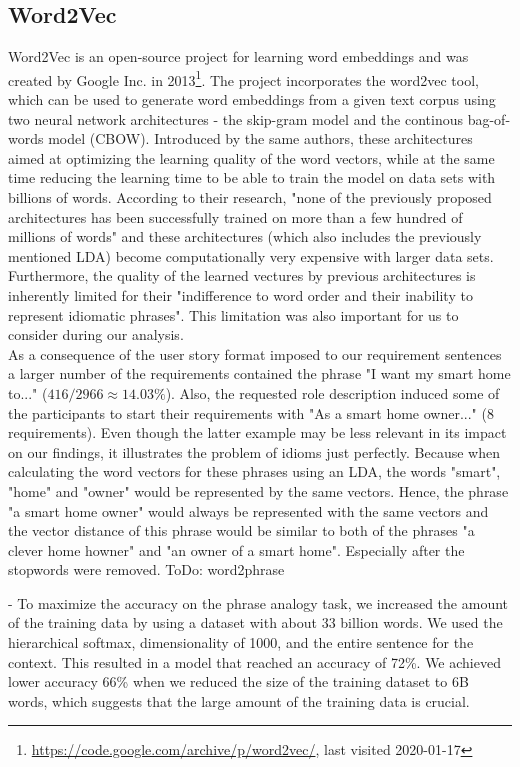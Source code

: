 \subsection{Word2Vec} %
\label{sub:word_2_vec}
Word2Vec is an open-source project for learning word embeddings and was created by Google Inc. in 2013\footnote{\label{word2vec_link}\url{https://code.google.com/archive/p/word2vec/}, last visited 2020-01-17}. The project incorporates the word2vec tool, which can be used to generate word embeddings from a given text corpus using two neural network architectures - the skip-gram model and the continous bag-of-words model (CBOW). Introduced by the same authors, these architectures aimed at optimizing the learning quality of the word vectors, while at the same time reducing the learning time to be able to train the model on data sets with billions of words\cite{mikolov_efficient_2013}. According to their research, "none of the previously proposed architectures has been successfully trained on more than a few hundred of millions of words"\cite[p1]{mikolov_efficient_2013} and these architectures (which also includes the previously mentioned LDA) become computationally very expensive with larger data sets. Furthermore, the quality of the learned vectures by previous architectures is inherently limited for their "indifference to word order and their inability to represent idiomatic phrases"\cite[p1]{mikolov_distributed_2013}. This limitation was also important for us to consider during our analysis.\\
As a consequence of the user story format imposed to our requirement sentences a larger number of the requirements contained the phrase "I want my smart home to..." ($416 / 2966 \approx14.03\%$). Also, the requested role description induced some of the participants to start their requirements with "As a smart home owner..." (8 requirements). Even though the latter example may be less relevant in its impact on our findings, it illustrates the problem of idioms just perfectly. Because when calculating the word vectors for these phrases using an LDA, the words "smart", "home" and "owner" would be represented by the same vectors. Hence, the phrase "a smart home owner" would always be represented with the same vectors and the vector distance of this phrase would be similar to both of the phrases "a clever home howner" and "an owner of a smart home". Especially after the stopwords were removed. 
\colorbox{yellow!30}{ToDo: word2phrase} 

- To maximize the accuracy on the phrase analogy task, we increased the amount of the training data
by using a dataset with about 33 billion words. We used the hierarchical softmax, dimensionality
of 1000, and the entire sentence for the context. This resulted in a model that reached an accuracy
of 72\%. We achieved lower accuracy 66\% when we reduced the size of the training dataset to 6B words, which suggests that the large amount of the training data is crucial.


